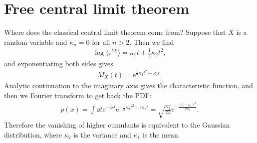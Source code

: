 \documentclass[11pt]{article}
\newcommand{\ii}{\mathrm i}
\newcommand{\e}{\mathrm e}
\theoremstyle{definition}
\begin{document}

\section{Free central limit theorem}
Where does the classical central limit theorem come from? Suppose that $X$ is a random variable and $\kappa_n = 0$ for all $n > 2$. Then we find
\begin{align}
\log \langle \e^{tX}\rangle = \kappa_1 t + \frac{1}{2}\kappa_2 t^2,
\end{align}
and exponentiating both sides gives
\begin{align}
M_X(t) = \e^{\frac{1}{2}\kappa_2 t^2 + \kappa_1 t}.
\end{align}
Analytic continuation to the imaginary axis gives the characteristic function, and then we Fourier transform to get back the PDF:
\begin{align}
p(x) =  \int\dd t \e^{-\ii xt}\e^{-\frac{1}{2}\kappa_2 t^2 + \ii\kappa_1 t} = \sqrt{\frac{\kappa_2}{2\pi}}\e^{-\frac{(x-\kappa_1)^2}{2\kappa_2}}.
\end{align}
Therefore the vanishing of higher cumulants is equivalent to the Gaussian distribution, where $\kappa_2$ is the variance and $\kappa_1$ is the mean.
\end{document}
